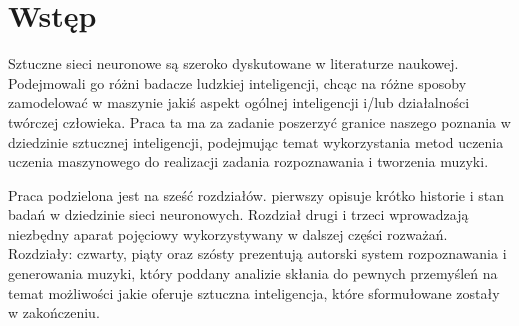 \section*{Wstęp}

\noindent Sztuczne sieci neuronowe są szeroko dyskutowane w literaturze naukowej. Podejmowali go różni badacze ludzkiej inteligencji, chcąc na różne sposoby zamodelować w maszynie jakiś aspekt ogólnej inteligencji i/lub działalności twórczej człowieka. Praca ta ma za zadanie poszerzyć granice naszego poznania w dziedzinie sztucznej inteligencji, podejmując temat wykorzystania metod uczenia uczenia maszynowego do realizacji zadania rozpoznawania i tworzenia muzyki.

Praca podzielona jest na sześć rozdziałów. pierwszy opisuje krótko historie i stan badań w dziedzinie sieci neuronowych. Rozdział drugi i trzeci wprowadzają niezbędny aparat pojęciowy wykorzystywany w dalszej części rozważań. Rozdziały: czwarty, piąty oraz szósty prezentują autorski system rozpoznawania i generowania muzyki, który poddany analizie skłania do pewnych przemyśleń na temat możliwości jakie oferuje sztuczna inteligencja, które sformułowane zostały w zakończeniu.


